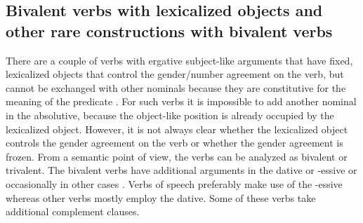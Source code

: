 
\subsection{Bivalent verbs with lexicalized objects and other rare constructions with bivalent verbs}
\label{sec:Bivalent verbs with frozen objects}

There are a couple of verbs with ergative subject-like arguments that have fixed, lexicalized objects that control the gender/number agreement on the verb, but cannot be exchanged with other nominals because they are constitutive for the meaning of the predicate . For such verbs it is impossible to add another nominal in the absolutive, because the object-like position is already occupied by the lexicalized object. However, it is not always clear whether the lexicalized object controls the gender agreement on the verb or whether the gender agreement is frozen. From a semantic point of view, the verbs can be analyzed as bivalent or trivalent. The bivalent verbs have additional arguments in the dative  or -essive  or occasionally in other cases . Verbs of speech preferably make use of the -essive whereas other verbs mostly employ the dative. Some of these verbs take additional complement clauses.
%
